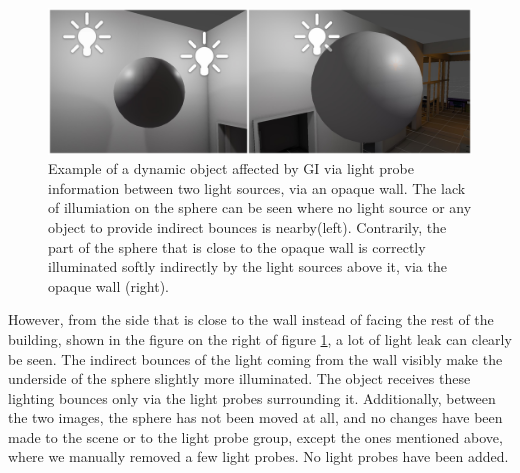 \begin{figure}[h]
	\centering
	\includegraphics[width=\linewidth]{Graphics/results/tests/office_ab.png}
	\caption{Example of a dynamic object affected by GI via light probe information between two light sources, via an opaque wall. The lack of illumiation on the sphere can be seen where no light source or any object to provide indirect bounces is nearby(left). Contrarily, the part of the sphere that is close to the opaque wall is correctly illuminated softly indirectly by the light sources above it, via the opaque wall (right).}
	\label{fig:office_test_a}
\end{figure}

However, from the side that is close to the wall instead of facing the rest of the building, shown in the figure on the right of figure \ref{fig:office_test_a}, a lot of light leak can clearly be seen. The indirect bounces of the light coming from the wall visibly make the underside of the sphere slightly more illuminated. The object receives these lighting bounces only via the light probes surrounding it. Additionally, between the two images, the sphere has not been moved at all, and no changes have been made to the scene or to the light probe group, except the ones mentioned above, where we manually removed a few light probes. No light probes have been added.\newline

